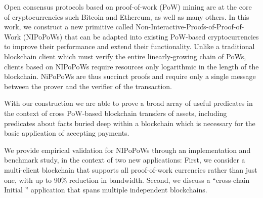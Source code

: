 Open consensus protocols based on proof-of-work (PoW)
mining are at the core of cryptocurrencies such
 Bitcoin and Ethereum, as well as many
others. In this work, we construct a new primitive called
Non-Interactive-Proofs-of-Proof-of-Work (NIPoPoWs) that can be adapted into
existing PoW-based cryptocurrencies to improve their performance and extend
their functionality. Unlike a traditional blockchain client which must verify
the entire linearly-growing chain of PoWs, clients based on NIPoPoWs require
resources only logarithmic in the length of the blockchain. NiPoPoWs
are thus succinct proofs and require only a single message between the prover and the verifier of the transaction. 

With our construction we are able to prove a broad array of useful
predicates in the context of cross PoW-based blockchain transfers of assets,  including predicates about facts buried deep within a blockchain which is necessary for the basic application of accepting payments. 

We provide empirical validation for NIPoPoWs through an implementation and
benchmark study, in the context of two new applications: First, we consider a
multi-client blockchain that supports all proof-of-work currencies rather than
just one, with up to 90\% reduction in bandwidth.  Second, we discuss a
``cross-chain Initial '' application that spans multiple independent blockchains.
